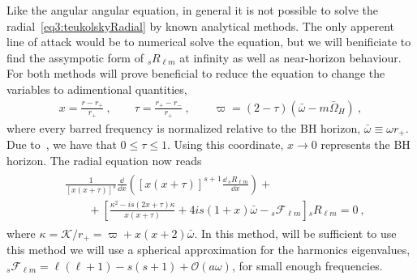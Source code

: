Like the angular angular equation, in general it is not possible to solve the radial~\eqref{eq3:teukolskyRadial} by known analytical methods.
The only apperent line of attack would be to numerical solve the equation, but we will benificiate to find the assympotic form of ${}_{s}R_{\ell m}$ at infinity as well as near-horizon behaviour. 
For both methods will prove beneficial to reduce the equation to change the variables to adimentional quantities,
\begin{align}
    x = \frac{r - r_{+}}{r_{+}} ~,\qquad \tau = \frac{r_{+} - r_{-}}{r_{+}} ~,\qquad \varpi = (2-\tau)( \bar\omega - m \bar{\Omega}_H) ~,
\end{align}
where every barred frequency is normalized relative to the BH horizon, $\bar\omega\equiv\omega r_{+}$. Due to~, we have that $0\le\tau\le 1$. Using this coordinate, $x\to0$ represents the BH horizon. The radial equation now reads
\begin{align}
    \begin{split}
        & \frac{1}{[x(x+\tau)]^s} \frac{\dd}{\dd x}\left( [x(x+\tau)]^{s+1} \frac{\dd \,{}_{s}R_{\ell m}}{\dd x} \right) + \\
        &\qquad + \left[ \frac{\kappa^2 - i s (2 x+\tau) \kappa}{x(x+\tau)} + 4 i s (1 + x)\bar{\omega} - {}_{s}\mathscr{F}_{\ell m} \right] {}_{s}R_{\ell m} = 0 ~,
    \end{split}
\end{align}
where $\kappa = \mathscr{K}/r_{+} = \varpi + x(x+2)\bar{\omega}$. In this method, will be sufficient to use  this method we will use a spherical approximation for the harmonics eigenvalues, ${}_{s}\mathscr{F}_{\ell m} = \ell(\ell+1) - s(s+1) + \mathscr{O}(a\omega)$, for small enough frequencies.

